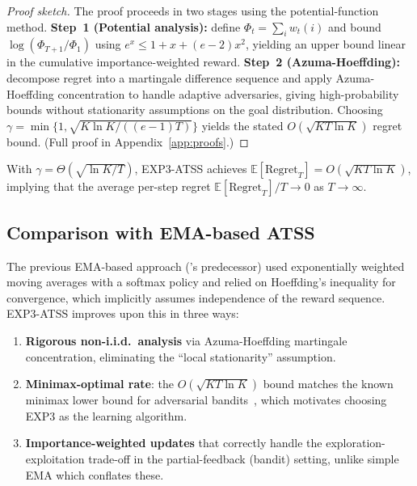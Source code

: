 \documentclass[acmtocl,review,anonymous]{acmart}
\begin{document}
\begin{proof}[Proof sketch]
  The proof proceeds in two stages using the potential-function method.
  \textbf{Step~1 (Potential analysis):} define
  $\Phi_t = \sum_i w_t(i)$ and bound $\log(\Phi_{T+1}/\Phi_1)$ using
  $e^x \le 1 + x + (e-2)x^2$, yielding an upper bound linear in the
  cumulative importance-weighted reward.  \textbf{Step~2
  (Azuma-Hoeffding):} decompose regret into a martingale difference
  sequence and apply Azuma-Hoeffding concentration to handle adaptive
  adversaries, giving high-probability bounds without stationarity
  assumptions on the goal distribution.  Choosing
  $\gamma = \min\{1,\sqrt{K\ln K/((e-1)T)}\}$ yields the stated
  $O(\sqrt{KT\ln K})$ regret bound.
  (Full proof in Appendix~\ref{app:proofs}.)
\end{proof}

\begin{corollary}
  With $\gamma = \Theta(\sqrt{\ln K / T})$, EXP3-ATSS achieves
  $\mathbb{E}[\mathrm{Regret}_T] = O(\sqrt{KT\ln K})$, implying
  that the average per-step regret
  $\mathbb{E}[\mathrm{Regret}_T]/T \to 0$ as $T \to \infty$.
\end{corollary}

\subsection{Comparison with EMA-based ATSS}

The previous EMA-based approach ('s predecessor)
used exponentially weighted moving averages with a softmax policy and
relied on Hoeffding's inequality for convergence, which implicitly
assumes independence of the reward sequence.  EXP3-ATSS improves upon
this in three ways:
\begin{enumerate}
  \item \textbf{Rigorous non-i.i.d.\ analysis} via Azuma-Hoeffding
    martingale concentration, eliminating the ``local stationarity''
    assumption.
  \item \textbf{Minimax-optimal rate}: the $O(\sqrt{KT\ln K})$
    bound matches the known minimax lower bound for adversarial
    bandits~\cite{AuerCesaBianchiFreundSchapire2002}, which motivates
    choosing EXP3 as the learning algorithm.
  \item \textbf{Importance-weighted updates} that correctly handle
    the exploration-exploitation trade-off in the partial-feedback
    (bandit) setting, unlike simple EMA which conflates these.
\end{enumerate}
\end{document}
